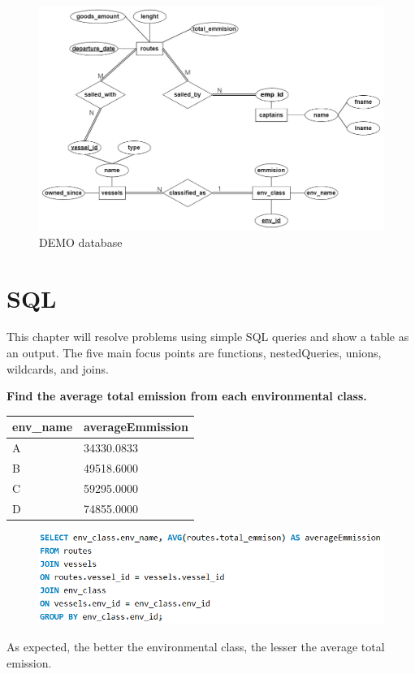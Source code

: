 \documentclass[a4paper]{article}
\begin{document}
\begin{figure} [h]
    \centering
    \includegraphics[width=1\linewidth]{assets/DB.png}
    \caption{DEMO database}
    \label{fig:dataBase}
\end{figure}

\newpage
\section{SQL}
This chapter will resolve problems using simple SQL queries and show a table as an output. The five main focus points are functions, nestedQueries, unions, wildcards, and joins.
\begin{flushleft}
    \textbf{Find the average total emission from each environmental class.}
    \begin{table}[!ht]
    \flushleft
    \begin{tabular}{|l|l|}
    \hline
        env\_name & averageEmmission \\ \hline
        A & 34330.0833 \\ \hline
        B & 49518.6000 \\ \hline
        C & 59295.0000 \\ \hline
        D & 74855.0000 \\ \hline
    \end{tabular}
    \end{table}
    \begin{figure} [h]
        \flushleft
        \includegraphics[width=0.8\linewidth]{code/SQLtotalEmmision.PNG}
        \label{fig:SQLtotalEmmision}
    \end{figure} \newline
    As expected, the better the environmental class, the lesser the average total emission.
\end{flushleft}
\end{document}
